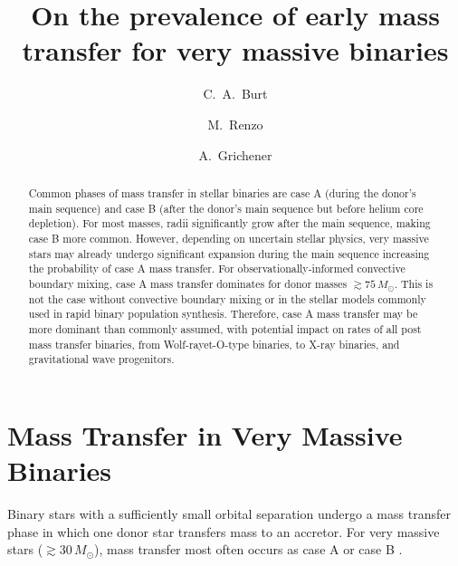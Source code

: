 \documentclass[twocolumn]{aastex63}
\begin{document}
\title{On the prevalence of early mass transfer for very massive binaries}

\author[0009-0008-2061-4946]{C.~A.~Burt}

\author[0000-0002-6718-9472]{M.~Renzo}

\author[0000-0002-2215-1841]{A.~Grichener}

\begin{abstract}
  Common phases of mass transfer in stellar binaries are case A
  (during the donor's main sequence) and case B (after the donor's
  main sequence but before helium core depletion). For most masses,
  radii significantly grow after the main sequence, making case B more
  common. However, depending on uncertain stellar physics, very
  massive stars may already undergo significant expansion during the
  main sequence increasing the probability of case A mass transfer.
  For observationally-informed convective boundary mixing, case A mass
  transfer dominates for donor masses $\gtrsim 75 \, M_{\odot}$. This
  is not the case without convective boundary mixing or in the stellar
  models commonly used in rapid binary population synthesis.
  Therefore, case A mass transfer may be more dominant than commonly
  assumed, with potential impact on rates of all post mass transfer
  binaries, from Wolf-rayet-O-type binaries, to X-ray binaries, and
  gravitational wave progenitors.
\end{abstract}

\section{Mass Transfer in Very Massive Binaries}

Binary stars with a sufficiently small orbital separation undergo a
mass transfer phase in which one donor star transfers mass to an
accretor. For very massive stars ($ \gtrsim 30 \, M_{\odot}$), mass
transfer most often occurs as case A or case B \cite{kippenhahn:67}.
\end{document}
